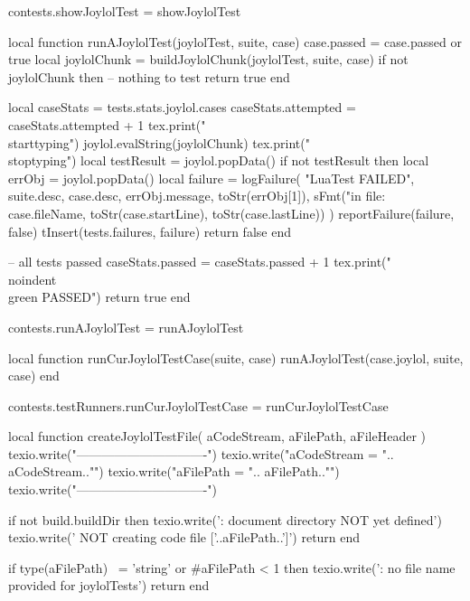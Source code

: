 contests.showJoylolTest = showJoylolTest
\stopLuaCode

\startLuaCode
local function runAJoylolTest(joylolTest, suite, case)
  case.passed = case.passed or true
  local joylolChunk = buildJoylolChunk(joylolTest, suite, case)
  if not joylolChunk then
    -- nothing to test
    return true
  end

  local caseStats = tests.stats.joylol.cases
  caseStats.attempted = caseStats.attempted + 1
  tex.print("\\starttyping")
  joylol.evalString(joylolChunk)
  tex.print("\\stoptyping")
  local testResult = joylol.popData()
  if not testResult then
    local errObj = joylol.popData()
    local failure = logFailure(
      "LuaTest FAILED",
      suite.desc,
      case.desc,
      errObj.message,
      toStr(errObj[1]),
      sFmt("in file: %
        case.fileName, toStr(case.startLine), toStr(case.lastLine))
      )
    reportFailure(failure, false)
    tInsert(tests.failures, failure)
    return false
  end

  -- all tests passed
  caseStats.passed = caseStats.passed + 1
  tex.print("\\noindent{\\green PASSED}")
  return true
end

contests.runAJoylolTest = runAJoylolTest

local function runCurJoylolTestCase(suite, case)
  runAJoylolTest(case.joylol, suite, case)
end

contests.testRunners.runCurJoylolTestCase = runCurJoylolTestCase
\stopLuaCode

\startMkIVCode
\def\createJoylolTestFile#1#2#3{%
  \directlua{
    thirddata.contests.createJoylolTestFile('#1', '#2', '#3')
  }
}
\stopMkIVCode

\startLuaCode
local function createJoylolTestFile(
  aCodeStream, aFilePath, aFileHeader
)
  texio.write("\n-------------------------------\n")
  texio.write("aCodeStream = ".. aCodeStream.."\n")
  texio.write("aFilePath   = ".. aFilePath.."\n")
  texio.write("\n-------------------------------\n")

  if not build.buildDir then
    texio.write('\nERROR: document directory NOT yet defined\n')
    texio.write('       NOT creating code file ['..aFilePath..']\n\n')
    return
  end

  if type(aFilePath) ~= 'string'
    or #aFilePath < 1 then
    texio.write('\nERROR: no file name provided for joylolTests\n\n')
    return
  end

